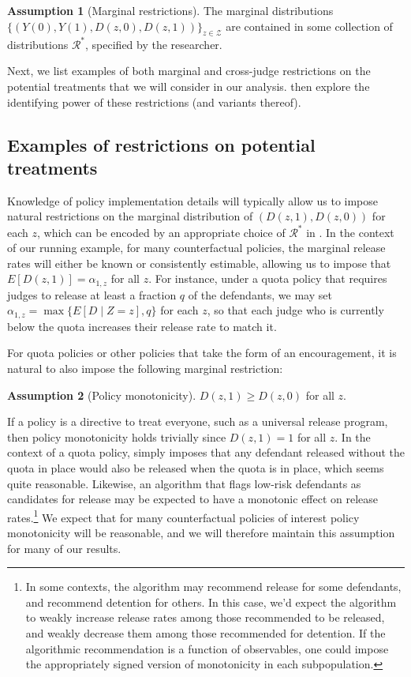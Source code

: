 \documentclass[12pt]{article}%
\theoremstyle{definition}
\newtheorem{assumption}{Assumption}
\newcommand\1{\operatorname{I}\indicatorfence}
\begin{document}
\begin{assumption}[Marginal restrictions]\label{assumption:first_stage_restrictions}
  The marginal distributions
  $\{(Y(0), Y(1), D(z, 0), \allowbreak D(z, 1)) \}_{z\in\mathcal{Z}}$ are contained in some
  collection of distributions $\mathcal{R}^{*}$, specified by the researcher.
\end{assumption}
Next, we list examples of both marginal and cross-judge restrictions on the potential treatments that we
will consider in our analysis.
 then explore the identifying power
of these restrictions (and variants thereof).

\subsection{Examples of restrictions on potential treatments}

Knowledge of policy implementation details will typically allow us to impose
natural restrictions on the marginal distribution of $(D(z,1), D(z,0))$ for each
$z$, which can be encoded by an appropriate choice of $\mathcal{R}^*$ in
. In the context of our running
example, for many counterfactual policies, the marginal release rates will
either be known or consistently estimable, allowing us to impose that
$E[D(z,1)] = \alpha_{1, z}$ for all $z$. For instance, under a quota policy that
requires judges to release at least a fraction $q$ of the defendants, we may set
$\alpha_{1, z}= \max\{E[D\mid Z=z], q \}$ for each $z$, so that each judge who
is currently below the quota increases their release rate to match it.

For quota policies or other policies that take the form of an
encouragement, it is natural to also impose the following marginal restriction:
\begin{assumption}[Policy monotonicity]\label{assumption:policy_monotonicity}
  $D(z,1)\geq D(z,0)$ for all $z$.
\end{assumption}
If a policy is a directive to treat everyone, such as a universal release
program, then policy monotonicity holds trivially since $D(z,1)=1$ for all $z$.
In the context of a quota policy,  simply
imposes that any defendant released without the quota in place would also be
released when the quota is in place, which seems quite reasonable. Likewise, an
algorithm that flags low-risk defendants as candidates for release may be
expected to have a monotonic effect on release
rates.\footnote{\label{fn:release_algorithm}In some contexts, the algorithm may
  recommend release for some defendants, and recommend detention for others. In
  this case, we'd expect the algorithm to weakly increase release rates among
  those recommended to be released, and weakly decrease them among those
  recommended for detention. If the algorithmic recommendation is a
  function of observables, one could impose the appropriately signed version of monotonicity in each subpopulation.} We expect that for
many counterfactual policies of interest policy monotonicity will be reasonable,
and we will therefore maintain this assumption for many of our results.
\end{document}
